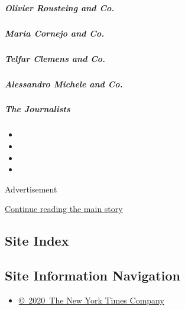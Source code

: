 \hypertarget{olivier-rousteing-and-co}{%
\subparagraph{Olivier Rousteing and
Co.}\label{olivier-rousteing-and-co}}

\href{/interactive/2020/04/13/t-magazine/maria-cornejo-olivier-rousteing-telfar-clemens-alessandro-michele.html\#maria-cornejo-and-co}{}

\hypertarget{maria-cornejo-and-co}{%
\subparagraph{Maria Cornejo and Co.}\label{maria-cornejo-and-co}}

\href{/interactive/2020/04/13/t-magazine/maria-cornejo-olivier-rousteing-telfar-clemens-alessandro-michele.html\#telfar-clemens-and-co}{}

\hypertarget{telfar-clemens-and-co}{%
\subparagraph{Telfar Clemens and Co.}\label{telfar-clemens-and-co}}

\href{/interactive/2020/04/13/t-magazine/maria-cornejo-olivier-rousteing-telfar-clemens-alessandro-michele.html\#alessandro-michele-and-co}{}

\hypertarget{alessandro-michele-and-co}{%
\subparagraph{Alessandro Michele and
Co.}\label{alessandro-michele-and-co}}

\href{/interactive/2020/04/13/t-magazine/foreign-correspondents.html}{}

\hypertarget{the-journalists}{%
\subparagraph{The Journalists}\label{the-journalists}}

\begin{itemize}
\item
\item
\item
\item
\end{itemize}

Advertisement

\protect\hyperlink{after-bottom}{Continue reading the main story}

\hypertarget{site-index}{%
\subsection{Site Index}\label{site-index}}

\hypertarget{site-information-navigation}{%
\subsection{Site Information
Navigation}\label{site-information-navigation}}

\begin{itemize}
\tightlist
\item
  \href{https://help.nytimes3xbfgragh.onion/hc/en-us/articles/115014792127-Copyright-notice}{©~2020~The
  New York Times Company}
\end{itemize}

